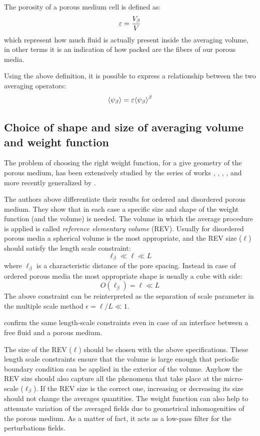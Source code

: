 The porosity of a porous medium cell is defined as:
\begin{equation}
	\varepsilon = \dfrac{V_\beta}{V}
	\label{eq:porosity}
\end{equation}
which represent how much fluid is actually present inside the averaging volume, in other terms it is an indication of how packed are the fibers of our porous media.

Using the above definition, it is possible to express a relationship between the two averaging operators:
\begin{equation}
	{\left< \psi_{\beta} \right>} =  \varepsilon {\left< \psi_{\beta} \right>}^{\beta}
	\label{eq:means_vs_meani}
\end{equation}

\subsection{Choice of shape and size of averaging volume and weight function}
\label{ch:filter}

The problem of choosing the right weight function, for a give geometry of the porous medium, has been extensively studied by the series of works \citet{quintard1994transport1}, \citet{quintard1994transport2}, \citet{quintard1994transport3}, \citet{quintard1994transport4}, \citet{quintard1994transport5} and more recently generalized by \citet{davit2017technical}.

The authors above differentiate their results for ordered and disordered porous medium. They show that in each case a specific size and shape of the weight function (and the volume) is needed.
The volume in which the average procedure is applied is called \textit{reference elementary volume} (REV).
Usually for disordered porous media a spherical volume is the most appropriate, and the REV size ($\ell$) should satisfy the length scale constraint:
$$
\ell_{\beta} \ll \ell \ll L
$$
where $\ell_{\beta}$ is a characteristic distance of the pore spacing.
Instead in case of ordered porous media the most appropriate shape is usually a cube with side:
$$
O(\ell_{\beta}) = \ell \ll L
$$
The above constraint can be reinterpreted as the separation of scale parameter in the multiple scale method $\epsilon = \ell/L \ll 1$.

\citet{ochoa1995momentum} confirm the same length-scale constraints even in case of an interface between a free fluid and a porous medium.

The size of the REV ($\ell$) should be chosen with the above specifications. These length scale constraints ensure that the volume is large enough that periodic boundary condition can be applied in the exterior of the volume. Anyhow the REV size should also capture all the phenomena that take place at the micro-scale ($\ell_{\beta}$).
If the REV size is the correct one, increasing or decreasing its size should not change the averages quantities. The weight function can also help to attenuate variation of the averaged fields due to geometrical inhomogenities of the porous medium. As a matter of fact, it acts as a low-pass filter for the perturbations fields.

